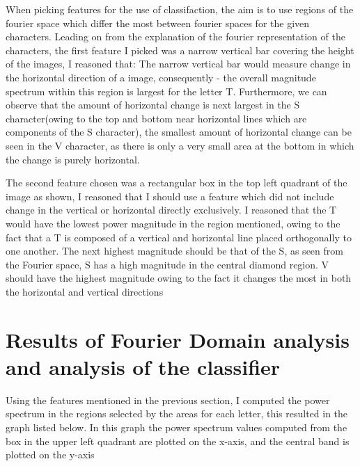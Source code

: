 \documentclass[12px]{article}
\begin{document}
\begin{flushleft}
    When picking features for the use of classifaction, the aim is to use regions of the
    fourier space which differ the most between fourier spaces for the given characters.
    Leading on from the explanation of the fourier representation of the characters,
    the first feature I picked was a narrow vertical bar covering the height of the images, I reasoned that:
    The narrow vertical bar would measure change in the  horizontal direction of a image, consequently -  the overall
    magnitude spectrum within this region is largest for the letter T. Furthermore, we can observe that the amount of horizontal change
    is next largest in the S character(owing to the top and bottom near horizontal lines which are components of the S character),
    the smallest amount of horizontal change can be seen in the V character, as there is only a very small area at the bottom in which the change
    is purely horizontal.

    \bigskip

    The second feature chosen was a rectangular box in the top left quadrant of the image as shown, I reasoned that
    I should use a feature which did not include change in the vertical or horizontal directly exclusively.
    I reasoned that the T would have the lowest power magnitude in the region mentioned, owing to the fact that a T
    is composed of a vertical and horizontal line placed orthogonally to one another. The next highest magnitude should
    be that of the S, as seen from the Fourier space, S has a high magnitude in the central diamond region. V should have
    the highest magnitude owing to the fact it changes the most in both the horizontal and vertical directions


\section{Results of Fourier Domain analysis and analysis of the classifier}
    Using the features mentioned in the previous section, I computed the power spectrum in the regions selected
    by the areas for each letter, this resulted in the graph listed below. In this graph the power spectrum values
    computed from the box in the upper left quadrant are plotted on the x-axis, and the central band is plotted on the y-axis


\end{flushleft}
\end{document}
